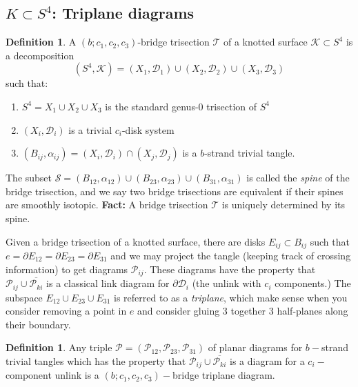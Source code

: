 \documentclass{amsart}
\theoremstyle{definition}
\newtheorem{definition}[theorem]{Definition}
\begin{document}
\subsection{$K \subset S^4$: Triplane diagrams}
\begin{definition}
A $(b; c_{1}, c_{2}, c_{3})$-bridge trisection $\mathcal{T}$ of a knotted surface $\mathcal{K} \subset S^{4}$ is a decomposition $$(S^{4}, \mathcal{K}) = (X_{1}, \mathcal{D}_{1}) \cup (X_{2}, \mathcal{D}_{2}) \cup (X_{3}, \mathcal{D}_{3})$$ such that:
\begin{enumerate}
\item $S^{4} = X_{1} \cup X_{2} \cup X_{3}$ is the standard genus-0 trisection of $S^{4}$
\item $(X_{i}, \mathcal{D}_{i})$ is a trivial $c_{i}$-disk system
\item $(B_{ij}, \alpha_{ij}) = (X_{i}, \mathcal{D}_{i}) \cap (X_{j}, \mathcal{D}_{j})$ is a $b$-strand trivial tangle.
\end{enumerate}
\hspace{1pt} \newline The subset $\mathcal{S} = (B_{12}, \alpha_{12}) \cup (B_{23}, \alpha_{23}) \cup (B_{31}, \alpha_{31})$ is called the \textit{spine} of the bridge trisection, and we say two bridge trisections are equivalent if their spines are smoothly isotopic. \textbf{Fact:} A bridge trisection $\mathcal{T}$ is uniquely determined by its spine.
\end{definition}
Given a bridge trisection of a knotted surface, there are disks $E_{ij} \subset B_{ij}$ such that $e = \partial E_{12} = \partial E_{23} =  \partial E_{31}$ and we may project the tangle (keeping track of crossing information) to get diagrams $\mathcal{P}_{ij}.$ These diagrams have the property that $\mathcal{P}_{ij} \cup \overline{\mathcal{P}_{ki}}$ is a classical link diagram for $\partial \mathcal{D}_{i}$ (the unlink with $c_{i}$ components.) The subspace $E_{12} \cup E_{23} \cup E_{31}$ is referred to as a \textit{triplane}, which make sense when you consider removing a point in $e$ and consider gluing 3 together 3 half-planes along their boundary.
\begin{definition}
Any triple $\mathcal{P} = (\mathcal{P}_{12}, \mathcal{P}_{23},\mathcal{P}_{31})$ of planar diagrams for $b-$strand trivial tangles which has the property that $\mathcal{P}_{ij} \cup \overline{\mathcal{P}_{ki}}$ is a diagram for a $c_{i}-$component unlink is a $(b; c_{1}, c_{2}, c_{3})-$bridge triplane diagram.
\end{definition}
\end{document}
